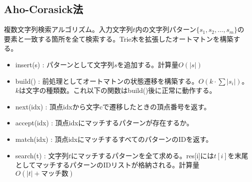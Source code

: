 \subsection{Aho-Corasick法}

複数文字列検索アルゴリズム。入力文字列$t$内の文字列パターン$\{s_1, s_2, \ldots, s_m \}$の要素と一致する箇所を全て検索する。Trie木を拡張したオートマトンを構築する。

\begin{itemize}
    \item insert(s) : パターンとして文字列$s$を追加する。計算量$O(|s|)$
    \item build() : 前処理としてオートマトンの状態遷移を構築する。$O(k\cdot\sum{|s_i|})$。 $k$は文字の種類数。これ以下の関数はbuild()後に正常に動作する。
    \item next(idx) : 頂点idxから文字cで遷移したときの頂点番号を返す。
    \item accept(idx) : 頂点idxにマッチするパターンが存在するか。
    \item match(idx) :  頂点idxにマッチするすべてのパターンのIDを返す。
    \item search(t) : 文字列$t$にマッチするパターンを全て求める。{\ttfamily res[i]}には$t[i]$を末尾としてマッチするパターンのIDリストが格納される。計算量$O(|t|+マッチ数)$
\end{itemize}


